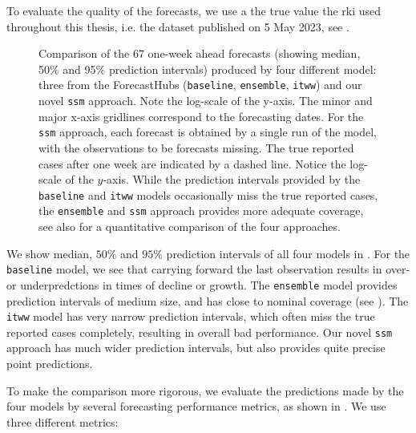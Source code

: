 To evaluate the quality of the forecasts, we use a the true value the \acrshort{rki} used throughout this thesis, i.e. the dataset published on 5 May 2023, see . 

\begin{figure}
    \resizebox{\textwidth}{!}{%
    }
    \caption{Comparison of the $67$ one-week ahead forecasts (showing median, 50\% and 95\% prediction intervals) produced by four different model: three from the ForecastHubs (\texttt{baseline}, \texttt{ensemble}, \texttt{itww}) and our novel \texttt{ssm} approach. Note the log-scale of the y-axis. The minor and major x-axis gridlines correspond to the forecasting dates. For the \texttt{ssm} approach, each forecast is obtained by a single run of the model, with the observations to be forecasts missing. The true reported cases after one week are indicated by a dashed line. Notice the log-scale of the $y$-axis. While the prediction intervals provided by the \texttt{baseline} and \texttt{itww} models occasionally miss the true reported cases, the \texttt{ensemble} and \texttt{ssm} approach provides more adequate coverage, see also  for a quantitative comparison of the four approaches.}

    \label{fig:regional_forecasts_comparison.tex}
\end{figure}

We show median, $50\%$ and $95\%$ prediction intervals of all four models in . 
For the \texttt{baseline} model, we see that carrying forward the last observation results in over- or underpredctions in times of decline or growth. The \texttt{ensemble} model provides prediction intervals of medium size, and has close to nominal coverage (see ). The \texttt{itww} model has very narrow prediction intervals, which often miss the true reported cases completely, resulting in overall bad performance. 
Our novel \texttt{ssm} approach has much wider prediction intervals, but also provides quite precise point predictions. 

To make the comparison more rigorous, we evaluate the predictions made by the four models by several forecasting performance metrics, as shown in . We use three different metrics: 

